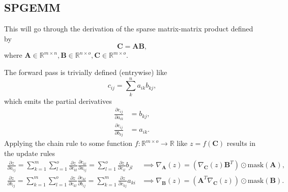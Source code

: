 \documentclass{article}
\newcommand{\mat}[1]{\bm{{#1}}}
\newcommand{\mask}[1]{\text{mask}\left( {#1} \right)}
\newcommand{\gradfn}[2]{\nabla_{{#1}}\left({#2}\right)} %
\theoremstyle{definition}
\begin{document}
\subsection{SPGEMM}
This will go through the derivation of the sparse matrix-matrix product defined by
\begin{equation}
  \mat{C} = \mat{A}\mat{B},
\end{equation}
where $\mat{A} \in \mathbb{R}^{m \times n}, \mat{B} \in \mathbb{R}^{n \times o}, \mat{C} \in \mathbb{R}^{m \times o}$.

The forward pass is trivially defined (entrywise) like
\begin{equation}
  c_{ij} = \sum_k^n a_{ik} b_{kj},
\end{equation}
which emits the partial derivatives
\begin{align}
  \frac{\partial c_{ij}}{\partial a_{ik}} &= b_{kj}, \\
  \frac{\partial c_{ij}}{\partial b_{kj}} &= a_{ik}.
\end{align}
Applying the chain rule to some function $f : \mathbb{R}^{m \times o} \to \mathbb{R}$ like $z=f\left(\mat{C}\right)$ results in the update rules
\begin{align}
  \frac{\partial z}{\partial a_{ij}} = \sum_{k=1}^m \sum_{l=1}^o \frac{\partial z}{\partial c_{kl}} \frac{\partial c_{kl}}{\partial a_{ij}} = \sum_{l=1}^o \frac{\partial z}{\partial c_{il}} b_{jl} &\implies \gradfn{\mat{A}}{z} = \left(\gradfn{\mat{C}}{z} \mat{B}^T\right) \odot \mask{\mat{A}}, \\
  \frac{\partial z}{\partial b_{ij}} = \sum_{k=1}^m \sum_{l=1}^o \frac{\partial z}{\partial c_{kl}} \frac{\partial c_{kl}}{\partial b_{ij}} = \sum_{k=1}^m \frac{\partial z}{\partial c_{kj}} a_{ki} &\implies \gradfn{\mat{B}}{z} = \left(\mat{A}^T \gradfn{\mat{C}}{z}\right) \odot \mask{\mat{B}}.
\end{align}
\end{document}
